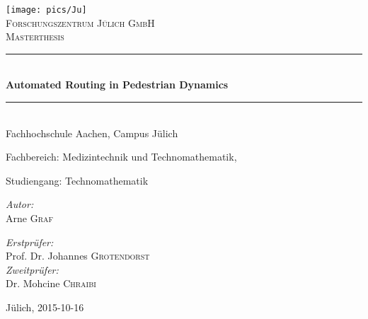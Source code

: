 \begin{titlepage}

\begin{center}

\texttt{[image: pics/Ju]}\\[1cm]    

\textsc{\LARGE Forschungszentrum J{\"u}lich GmbH}\\[1.5cm]

\textsc{\Large Masterthesis}\\[0.5cm]


\newcommand{\HHRule}{\rule{\linewidth}{0.5mm}}
\HHRule \\[0.4cm]
{ \huge \bfseries Automated Routing in Pedestrian Dynamics}\\[0.4cm]
\HHRule \\[1.5cm]

Fachhochschule Aachen, Campus J{\"u}lich

Fachbereich: Medizintechnik und Technomathematik,

Studiengang: Technomathematik

\vfill

\begin{minipage}{0.3\textwidth}
\begin{flushleft} \large
\emph{Autor:}\\
Arne \textsc{Graf}
\end{flushleft}
\end{minipage}
\hfill
\begin{minipage}{0.6\textwidth}
\begin{flushright} \large
\emph{Erstpr{\"u}fer:} \\
Prof. Dr. Johannes \textsc{Grotendorst} \\
\emph{Zweitpr{\"u}fer:} \\
Dr. Mohcine \textsc{Chraibi}
\end{flushright}
\end{minipage}

\vfill

{\large J{\"u}lich, 2015-10-16}

\end{center}

\end{titlepage}